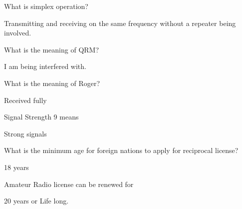 \documentclass[a4paper]{article}
\begin{document}

\begin{question}
	What is simplex operation?
\end{question}
\begin{solution}
	Transmitting and receiving on the same frequency without a repeater being involved.
\end{solution}

\vspace{5mm}



\begin{question}
	What is the meaning of QRM?
\end{question}
\begin{solution}
	I am being interfered with.
\end{solution}

\vspace{5mm}



\begin{question}
	What is the meaning of \apostrophe{}Roger\apostrophe{}?
\end{question}
\begin{solution}
	Received fully
\end{solution}

\vspace{5mm}



\begin{question}
	Signal Strength \apostrophe{}9\apostrophe{} means \spaces
\end{question}
\begin{solution}
	Strong signals
\end{solution}

\vspace{5mm}



\begin{question}
	What is the minimum age for foreign nations to apply for reciprocal license?
\end{question}
\begin{solution}
	18 years
\end{solution}

\vspace{5mm}



\begin{question}
	Amateur Radio license can be renewed for \spaces
\end{question}
\begin{solution}
	20 years or Life long.
\end{solution}
\end{document}
